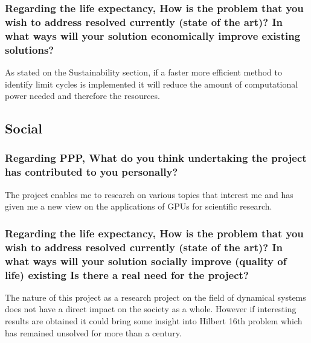 \subsubsection*{Regarding the life expectancy, How is the problem that you wish
to address resolved currently (state of the art)? In what ways will your
solution economically improve existing solutions?}

As stated on the Sustainability section, if a faster more efficient method to
identify limit cycles is implemented it will reduce the amount of computational
power needed and therefore the resources.


\subsection{Social}

\subsubsection*{Regarding PPP, What do you think undertaking the project has
contributed to you personally?}

The project enables me to research on various topics that interest me and has
given me a new view on the applications of GPUs for scientific research.

\subsubsection*{Regarding the life expectancy, How is the problem that you wish
to address resolved currently (state of the art)? In what ways will your
solution socially improve (quality of life) existing Is there a real need for
the project?}

The nature of this project as a research project on the field of dynamical
systems does not have a direct impact on the society as a whole. However if
interesting results are obtained it could bring some insight into Hilbert 16th
problem which has remained unsolved for more than a century.
